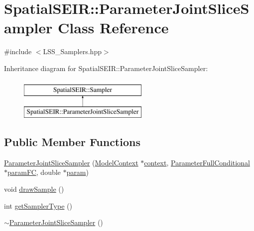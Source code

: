 \hypertarget{classSpatialSEIR_1_1ParameterJointSliceSampler}{\section{Spatial\-S\-E\-I\-R\-:\-:Parameter\-Joint\-Slice\-Sampler Class Reference}
\label{classSpatialSEIR_1_1ParameterJointSliceSampler}
}


{\ttfamily \#include $<$L\-S\-S\-\_\-\-Samplers.\-hpp$>$}

Inheritance diagram for Spatial\-S\-E\-I\-R\-:\-:Parameter\-Joint\-Slice\-Sampler\-:\begin{figure}[H]
\begin{center}
\leavevmode
\includegraphics[height=2.000000cm]{classSpatialSEIR_1_1ParameterJointSliceSampler}
\end{center}
\end{figure}
\subsection*{Public Member Functions}
\begin{DoxyCompactItemize}
\item 
\hyperlink{classSpatialSEIR_1_1ParameterJointSliceSampler_af4a09549dbc8a2157f1e6879ecdbddf5}{Parameter\-Joint\-Slice\-Sampler} (\hyperlink{classSpatialSEIR_1_1ModelContext}{Model\-Context} $\ast$\hyperlink{classSpatialSEIR_1_1ParameterJointSliceSampler_adc70f8f5143b09aa830aa7b1c12c0853}{context}, \hyperlink{classSpatialSEIR_1_1ParameterFullConditional}{Parameter\-Full\-Conditional} $\ast$\hyperlink{classSpatialSEIR_1_1ParameterJointSliceSampler_a898ccd247b2ef346005ac437a600f4d4}{param\-F\-C}, double $\ast$\hyperlink{classSpatialSEIR_1_1ParameterJointSliceSampler_a405ce2949e75688013da196ecc139fa6}{param})
\item 
void \hyperlink{classSpatialSEIR_1_1ParameterJointSliceSampler_aceea42431db7eee7f58d4852cc8d1462}{draw\-Sample} ()
\item 
int \hyperlink{classSpatialSEIR_1_1ParameterJointSliceSampler_ac435f72bd91e0585b45d42233b0741dc}{get\-Sampler\-Type} ()
\item 
\hyperlink{classSpatialSEIR_1_1ParameterJointSliceSampler_a7c6303b5052965fce2460dc9f190b129}{$\sim$\-Parameter\-Joint\-Slice\-Sampler} ()
\end{DoxyCompactItemize}
